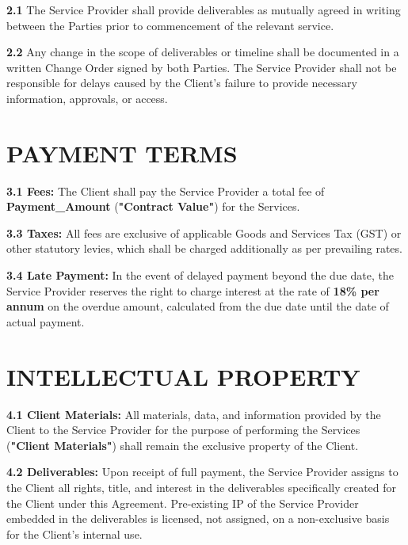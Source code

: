 \documentclass[10pt]{article}
\begin{document}
\textbf{2.1} The Service Provider shall provide deliverables as mutually agreed in writing between the Parties prior to commencement of the relevant service.

\textbf{2.2} Any change in the scope of deliverables or timeline shall be documented in a written Change Order signed by both Parties. The Service Provider shall not be responsible for delays caused by the Client's failure to provide necessary information, approvals, or access.

\section{PAYMENT TERMS}

\textbf{3.1 Fees:} The Client shall pay the Service Provider a total fee of \textbf{{{Payment_Amount}}} (\textbf{"Contract Value"}) for the Services.


\textbf{3.3 Taxes:} All fees are exclusive of applicable Goods and Services Tax (GST) or other statutory levies, which shall be charged additionally as per prevailing rates.

\textbf{3.4 Late Payment:} In the event of delayed payment beyond the due date, the Service Provider reserves the right to charge interest at the rate of \textbf{18\% per annum} on the overdue amount, calculated from the due date until the date of actual payment.

\section{INTELLECTUAL PROPERTY}

\textbf{4.1 Client Materials:} All materials, data, and information provided by the Client to the Service Provider for the purpose of performing the Services (\textbf{"Client Materials"}) shall remain the exclusive property of the Client.

\textbf{4.2 Deliverables:} Upon receipt of full payment, the Service Provider assigns to the Client all rights, title, and interest in the deliverables specifically created for the Client under this Agreement. Pre-existing IP of the Service Provider embedded in the deliverables is licensed, not assigned, on a non-exclusive basis for the Client's internal use.
\end{document}
